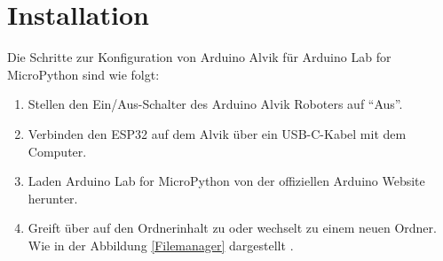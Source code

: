 \section{Installation}
Die Schritte zur Konfiguration von Arduino Alvik für Arduino Lab for MicroPython sind wie folgt:
\begin{enumerate}
	\item Stellen den Ein/Aus-Schalter des Arduino Alvik Roboters auf ``Aus''. 
	\item Verbinden den ESP32 auf dem Alvik über ein USB-C-Kabel mit dem Computer.
	\item Laden Arduino Lab for MicroPython von der offiziellen Arduino Website herunter.
	\item Greift über  auf den Ordnerinhalt zu oder wechselt zu einem neuen Ordner. Wie in der Abbildung \ref{Filemanager} dargestellt \cite{Jose:2025}.	
	

\end{enumerate}
